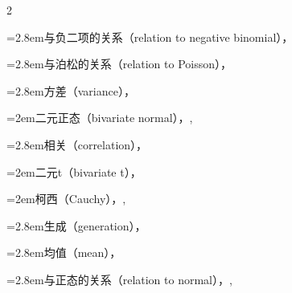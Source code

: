 \begin{multicols}{2}
\par\noindent\hangindent=2.8em\hspace*{1.8em}\label{idx:270}与负二项的关系（relation to negative binomial），\hyperref[exercise:3.12]{\pageref*{exercise:3.12}}\par
\par\noindent\hangindent=2.8em\hspace*{1.8em}\label{idx:271}与泊松的关系（relation to Poisson），\hyperref[exercise:4.15]{\pageref*{exercise:4.15}}\par
\par\noindent\hangindent=2.8em\hspace*{1.8em}\label{idx:272}方差（variance），\hyperref[ex:2.3.5]{\pageref*{ex:2.3.5}}\par
\par\noindent\hangindent=2em\hspace*{1em}\label{idx:273}二元正态（bivariate normal），\hyperref[def:4.5.10]{\pageref*{def:4.5.10}}, \hyperref[exercise:4.45]{\pageref*{exercise:4.45}}\par
\par\noindent\hangindent=2.8em\hspace*{1.8em}\label{idx:274}相关（correlation），\hyperref[item:10.17.d]{\pageref*{item:10.17.d}}\par
\par\noindent\hangindent=2em\hspace*{1em}\label{idx:275}二元t（bivariate t），\hyperref[idxocc:275:479]{\pageref*{idxocc:275:479}}\par
\par\noindent\hangindent=2em\hspace*{1em}\label{idx:276}柯西（Cauchy），\hyperref[eq:3.3.19]{\pageref*{eq:3.3.19}}, \hyperref[exercise:3.39]{\pageref*{exercise:3.39}}\par
\par\noindent\hangindent=2.8em\hspace*{1.8em}\label{idx:277}生成（generation），\hyperref[exercise:2.12]{\pageref*{exercise:2.12}}\par
\par\noindent\hangindent=2.8em\hspace*{1.8em}\label{idx:278}均值（mean），\hyperref[ex:2.2.4]{\pageref*{ex:2.2.4}}\par
\par\noindent\hangindent=2.8em\hspace*{1.8em}\label{idx:279}与正态的关系（relation to normal），\hyperref[ex:4.3.6]{\pageref*{ex:4.3.6}}, \hyperref[exercise:4.28]{\pageref*{exercise:4.28}}\par

\end{multicols}
